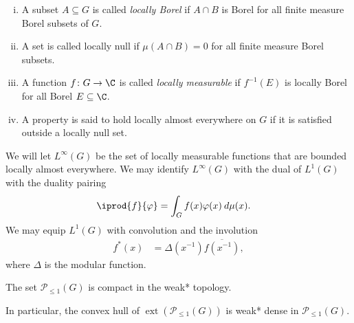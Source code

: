 \documentclass[10pt]{mypackage}
\begin{document}
\begin{definition}\hfill
  \begin{enumerate}[(i)]
    \item A subset $A\subseteq G$ is called \textit{locally Borel} if $A\cap B$ is Borel for all finite measure Borel subsets of $G$. 
    \item A set is called locally null if $\mu\left( A\cap B \right) = 0$ for all finite measure Borel subsets. 
    \item A function $f\colon G\to \C$ is called \textit{locally measurable} if $f^{-1}\left( E \right)$ is locally Borel for all Borel $E\subseteq \C$.
    \item A property is said to hold locally almost everywhere on $G$ if it is satisfied outside a locally null set.
  \end{enumerate}
\end{definition}
We will let $L^{\infty}\left( G \right)$ be the set of locally measurable functions that are bounded locally almost everywhere. We may identify $L^{\infty}\left( G \right)$ with the dual of $L^{1}\left( G \right)$ with the duality pairing
\begin{align*}
  \iprod{f}{\varphi} &= \int_{G}^{} f(x)\varphi(x)\:d\mu(x).
\end{align*}
We may equip $L^1\left( G \right)$ with convolution and the involution
\begin{align*}
  f^{\ast}\left( x \right) &= \Delta\left( x^{-1} \right) \overline{f\left( x^{-1} \right)},
\end{align*}
where $\Delta$ is the modular function.
\begin{lemma}
  The set $\mathcal{P}_{\leq 1}\left( G \right)$ is compact in the weak* topology.
\end{lemma}
In particular, the convex hull of $\operatorname{ext}\left( \mathcal{P}_{\leq 1}\left( G \right) \right)$ is weak* dense in $\mathcal{P}_{\leq 1}\left( G \right)$.
\end{document}
